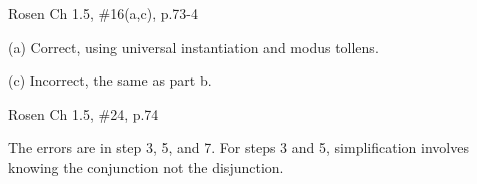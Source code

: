 \documentclass[12pt]{exam}
\newenvironment{my_item}{
\begin{itemize}
    \setlength{\itemsep}{1pt}
    \setlength{\parskip}{0pt}
    \setlength{\parsep}{0pt}
}{\end{itemize}}
\begin{document}
\begin{questions}
\question[8] Rosen Ch 1.5, \#16(a,c), p.73-4
    \begin{solution}
    \begin{my_item}
        \item[(a)] Correct, using universal instantiation and modus tollens.
        \item[(c)] Incorrect, the same as part b.
    \end{my_item}
    \end{solution}

\question[8] Rosen Ch 1.5, \#24, p.74
    \begin{solution}
    The errors are in step 3, 5, and 7.  For steps 3 and 5, simplification
    involves knowing the conjunction not the disjunction.
    \end{solution}


\end{questions}
\end{document}
